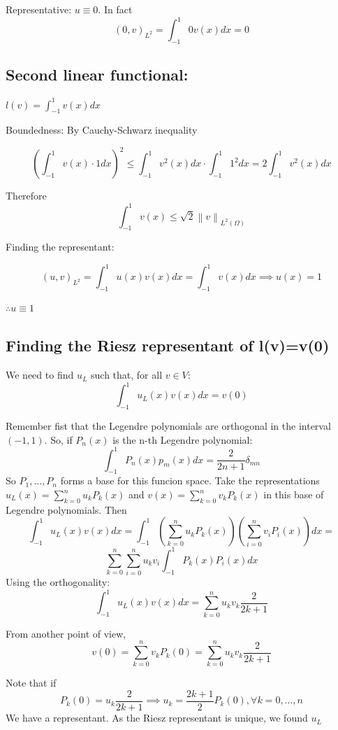\documentclass{article}
\newcommand{\normL}[2]{\left\lVert#1\right\rVert_{L^{#2}(\Omega)}}
\begin{document}
    Representative: $u \equiv 0$. In fact
    \[
        (0,v)_{L^2} = \int_{-1}^{1} 0 v(x) dx = 0
    \]

    \subsection*{Second linear functional:}
    $l(v) = \int_{-1}^{1}v(x) dx$

    Boundedness: By Cauchy-Schwarz inequality

    \[
        \left( \int_{-1}^{1} v(x) \cdot 1 dx \right)^2 \le \int_{-1}^{1} v^2(x) dx \cdot \int_{-1}^{1}1^2 dx = 2 \int_{-1}^{1} v^2(x) dx
    \]

    Therefore
    \[
        \int_{-1}^{1}v(x) \le \sqrt{2}\normL{v}{2}
    \]

    Finding the representant:

    \[
        (u,v)_{L^2} = \int_{-1}^{1}u(x)v(x) dx = \int_{-1}^{1} v(x) dx \implies u(x) = 1
    \]

    $\therefore u \equiv 1$

    \subsection*{Finding the Riesz representant of l(v)=v(0)}
    We need to find $u_L$ such that, for all $v \in V$:
    \[
        \int_{-1}^{1}u_L(x)v(x) dx = v(0)
    \]
    
    Remember fist that the Legendre polynomials are orthogonal in the interval $(-1,1)$. So, if $P_n(x)$ is the n-th Legendre polynomial:
    \[
        \int_{-1}^{1}P_n(x)p_m(x) dx = \frac{2}{2n+1}\delta_{mn}
    \] 
    So $P_1, \dots, P_n$ forms a base for this funcion space. Take the representations $u_L(x) = \sum_{k=0}^{n}u_kP_k(x)$ and $v(x) = \sum_{k=0}^{n} v_k P_k(x)$ in this base of Legendre polynomials. Then
    \[
        \int_{-1}^{1} u_L(x) v(x) dx = \int_{-1}^{1}\left(\sum_{k=0}^{n}u_k P_k(x) \right) \left( \sum_{i=0}^{n} v_i P_i(x) \right) dx =
    \]
    \[
        \sum_{k=0}^{n}\sum_{i=0}^{n} u_k v_i \int_{-1}^{1} P_k(x) P_i(x) dx
    \]
    Using the orthogonality:
    \[
        \int_{-1}^{1}u_L(x) v(x) dx = \sum_{k=0}^{n}u_k v_k \frac{2}{2k+1}
    \]

    From another point of view,
    \[
        v(0) = \sum_{k=0}^{n} v_k P_k(0) = \sum_{k=0}^{n}u_k v_k \frac{2}{2k+1}
    \]

    Note that if 
    \[
        P_k(0) = u_k \frac{2}{2k+1} \implies u_k = \frac{2k + 1}{2}P_k(0), \forall k =0, \dots, n
    \]
    We have a representant. As the Riesz representant is unique, we found $u_L$
\end{document}
